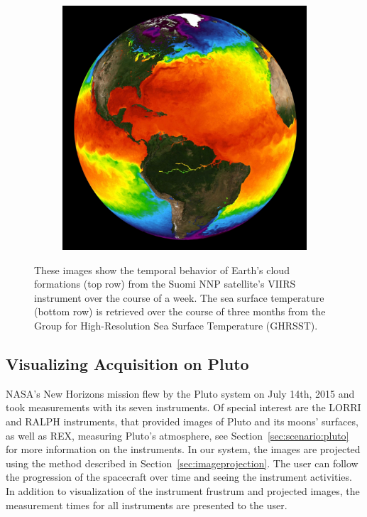 \documentclass[journal]{vgtc}                %
\begin{document}
\begin{figure}
\begin{subfigure}[tb]{0.32\linewidth}
	\end{subfigure}
    \begin{subfigure}[tb]{0.32\linewidth}
    	\includegraphics[width=\textwidth]{earth_temporal/earth_temporal_sea_surface3.png}
	\end{subfigure}
    \caption{These images show the temporal behavior of Earth's cloud formations (top row) from the Suomi NNP satellite's VIIRS instrument over the course of a week. The sea surface temperature (bottom row) is retrieved over the course of three months from the Group for High-Resolution Sea Surface Temperature (GHRSST).}  \vspace{-4mm}
    \label{fig:temporal_earth}
\end{figure}


\subsection{Visualizing Acquisition on Pluto}
NASA's New Horizons mission flew by the Pluto system on July 14th, 2015 and took measurements with its seven instruments.
Of special interest are the LORRI and RALPH instruments, that provided images of Pluto and its moons' surfaces, as well as REX, measuring Pluto's atmosphere, see Section~\ref{sec:scenario:pluto} for more information on the instruments.
In our system, the images are projected using the method described in Section~\ref{sec:imageprojection}.
The user can follow the progression of the spacecraft over time and seeing the instrument activities.
In addition to visualization of the instrument frustrum and projected images, the measurement times for all instruments are presented to the user. 
\end{document}

